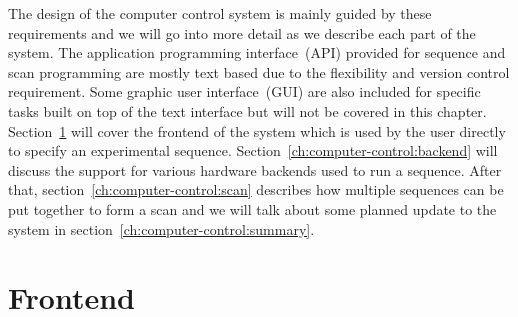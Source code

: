 The design of the computer control system is mainly guided by these requirements
and we will go into more detail as we describe each part of the system.
The application programming interface~(API) provided for sequence and scan programming
are mostly text based due to the flexibility and version control requirement.
Some graphic user interface~(GUI) are also included for specific tasks
built on top of the text interface but will not be covered in this chapter.
Section~\ref{ch:computer-control:frontend} will cover the frontend of the system
which is used by the user directly to specify an experimental sequence.
Section~\ref{ch:computer-control:backend} will discuss the support for various
hardware backends used to run a sequence.
After that, section~\ref{ch:computer-control:scan} describes how multiple sequences
can be put together to form a scan and
we will talk about some planned update to the system in
section~\ref{ch:computer-control:summary}.

\section{Frontend}
\label{ch:computer-control:frontend}

